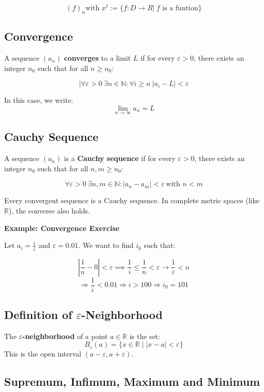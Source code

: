 \[
(f)_n \text{with } x^t := \{ f: D\to R | \ f \text{ is a funtion}\}
\]

\subsection{Convergence}

A sequence \((a_n)\) \textbf{converges} to a limit \(L\) if for every \(\varepsilon > 0\), there exists an integer \(n_0\) such that for all \(n \ge n_0\):

\[
|\forall \varepsilon > 0\ \exists n \in \mathbb{N}: \forall i \ge n\ |a_i - L| < \varepsilon
\]

In this case, we write:
\[
\lim_{n \to \infty} a_n = L
\]

\subsection{Cauchy Sequence}

A sequence \((a_n)\) is a \textbf{Cauchy sequence} if for every \(\varepsilon > 0\), there exists an integer \(n_0\) such that for all \(n, m \ge n_0\):

\[
\forall \varepsilon > 0\ \exists n,m \in \mathbb{N}: |a_n - a_m| < \varepsilon\ \text{with } n < m
\]

Every convergent sequence is a Cauchy sequence. In complete metric spaces (like \(\mathbb{R}\)), the converse also holds.

\textbf{Example: Convergence Exercise}

Let \(a_i = \frac{1}{i}\) and \(\varepsilon = 0.01\). We want to find \(i_0\) such that:

\[
\left|\frac{1}{n} - 0\right| < \varepsilon \implies \frac{1}{i} \le \frac{1}{n} < \varepsilon \rightarrow \frac{1}{\varepsilon} < n
\]
\[
\Rightarrow \frac{1}{i} < 0.01 \Rightarrow i > 100
\Rightarrow i_0 = 101
\]

\subsection{Definition of \texorpdfstring{\(\varepsilon\)}{ε}-Neighborhood}

The \textbf{\(\varepsilon\)-neighborhood} of a point \(a \in \mathbb{R}\) is the set:
\[
B_\varepsilon(a) = \{x \in \mathbb{R} \mid |x - a| < \varepsilon\}
\]
This is the open interval \((a - \varepsilon, a + \varepsilon)\).

\subsection{Supremum, Infimum, Maximum and Minimum}

